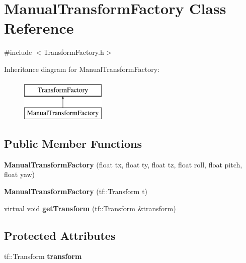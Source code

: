 \hypertarget{classManualTransformFactory}{\section{\-Manual\-Transform\-Factory \-Class \-Reference}
\label{classManualTransformFactory}
}


{\ttfamily \#include $<$\-Transform\-Factory.\-h$>$}

\-Inheritance diagram for \-Manual\-Transform\-Factory\-:\begin{figure}[H]
\begin{center}
\leavevmode
\includegraphics[height=2.000000cm]{classManualTransformFactory}
\end{center}
\end{figure}
\subsection*{\-Public \-Member \-Functions}
\begin{DoxyCompactItemize}
\item 
\hypertarget{classManualTransformFactory_afc411062d26d5d88f6563016a292b940}{{\bfseries \-Manual\-Transform\-Factory} (float tx, float ty, float tz, float roll, float pitch, float yaw)}\label{classManualTransformFactory_afc411062d26d5d88f6563016a292b940}

\item 
\hypertarget{classManualTransformFactory_a3df3685278325ed40137a353b590a1b1}{{\bfseries \-Manual\-Transform\-Factory} (tf\-::\-Transform t)}\label{classManualTransformFactory_a3df3685278325ed40137a353b590a1b1}

\item 
\hypertarget{classManualTransformFactory_a9684b70631ae69eca554ad6e0c8986f4}{virtual void {\bfseries get\-Transform} (tf\-::\-Transform \&transform)}\label{classManualTransformFactory_a9684b70631ae69eca554ad6e0c8986f4}

\end{DoxyCompactItemize}
\subsection*{\-Protected \-Attributes}
\begin{DoxyCompactItemize}
\item 
\hypertarget{classManualTransformFactory_a291e5ff15ef05e7fc236c264c2438f0d}{tf\-::\-Transform {\bfseries transform}}\label{classManualTransformFactory_a291e5ff15ef05e7fc236c264c2438f0d}

\end{DoxyCompactItemize}


